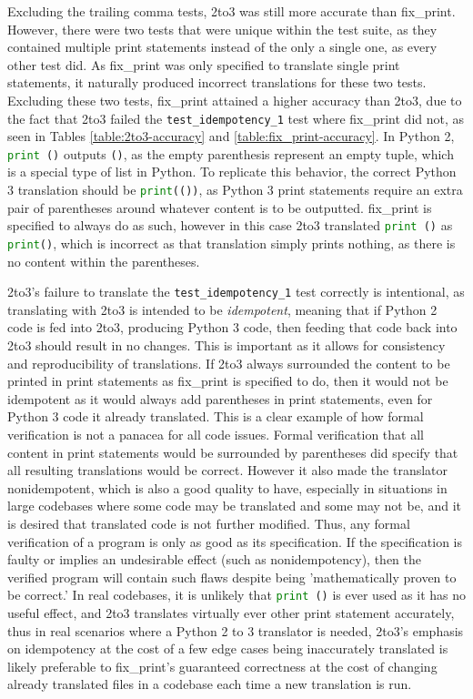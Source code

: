 Excluding the trailing comma tests, 2to3 was still more accurate than fix\_print. However, there were two tests that were unique within the test suite, as they contained multiple print statements instead of the only a single one, as every other test did. As fix\_print was only specified to translate single print statements, it naturally produced incorrect translations for these two tests. Excluding these two tests, fix\_print attained a higher accuracy than 2to3, due to the fact that 2to3 failed the \verb|test_idempotency_1| test where fix\_print did not, as seen in Tables \ref{table:2to3-accuracy} and \ref{table:fix_print-accuracy}. In Python 2, \lstinline[language=Python, style=pythonstyle]|print ()| outputs \verb|()|, as the empty parenthesis represent an empty tuple, which is a special type of list in Python. To replicate this behavior, the correct Python 3 translation should be \lstinline[language=Python, style=pythonstyle]|print(())|, as Python 3 print statements require an extra pair of parentheses around whatever content is to be outputted. fix\_print is specified to always do as such, however in this case 2to3 translated \lstinline[language=Python, style=pythonstyle]|print ()| as \lstinline[language=Python, style=pythonstyle]|print()|, which is incorrect as that translation simply prints nothing, as there is no content within the parentheses.

2to3's failure to translate the \verb|test_idempotency_1| test correctly is intentional, as translating with 2to3 is intended to be \textit{idempotent}, meaning that if Python 2 code is fed into 2to3, producing Python 3 code, then feeding that code back into 2to3 should result in no changes. This is important as it allows for consistency and reproducibility of translations. If 2to3 always surrounded the content to be printed in print statements as fix\_print is specified to do, then it would not be idempotent as it would always add parentheses in print statements, even for Python 3 code it already translated. This is a clear example of how formal verification is not a panacea for all code issues. Formal verification that all content in print statements would be surrounded by parentheses did specify that all resulting translations would be correct. However it also made the translator nonidempotent, which is also a good quality to have, especially in situations in large codebases where some code may be translated and some may not be, and it is desired that translated code is not further modified. Thus, any formal verification of a program is only as good as its specification. If the specification is faulty or implies an undesirable effect (such as nonidempotency), then the verified program will contain such flaws despite being 'mathematically proven to be correct.' In real codebases, it is unlikely that \lstinline[language=Python, style=pythonstyle]|print ()| is ever used as it has no useful effect, and 2to3 translates virtually ever other print statement accurately, thus in real scenarios where a Python 2 to 3 translator is needed, 2to3's emphasis on idempotency at the cost of a few edge cases being inaccurately translated is likely preferable to fix\_print's guaranteed correctness at the cost of changing already translated files in a codebase each time a new translation is run.

